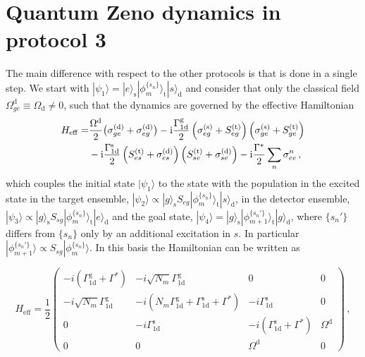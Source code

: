 \documentclass[twocolumn,pra,aps,superscriptaddress,showpacs]{revtex4-1}
\newcommand{\ket}[1]{|#1\rangle}
\def\oned{\mathrm{1d}}
\newcommand{\src}{\mathrm{(s)}}
\newcommand{\trg}{\mathrm{(t)}}
\newcommand{\dtc}{\mathrm{(d)}}
\def\ii{\mathord{\rm i}}
\newcommand{\rs}{\mathrm{s}}
\newcommand{\rd}{\mathrm{d}}
\newcommand{\rg}{\mathrm{g}}
\newcommand{\rt}{\mathrm{t}}
\begin{document}
\section{Quantum Zeno dynamics in protocol 3}\label{appendix: zeno2}


The main difference with respect to the other protocols is that is done in a single step. We start with  $\ket{\psi_1} = \ket{e}_\rs \ket{\phi_m^{\{s_n\}}}_\rt \ket{s}_\rd$ and consider that only the classical field $\Omega_{ge}^\rd\equiv \Omega_\rd \neq 0$, such that the dynamics are governed by the effective Hamiltonian
%
\begin{align} \label{eqSM:Hameff}
H_\mathrm{eff}
	=& \frac{\Omega^\rd}{2}\big(\sigma_{ge}^\dtc + \sigma_{eg}^\dtc \big) 
		-\ii \frac{\Gamma_{\oned}^\rg}{2}\left(\sigma_{eg}^\src + S_{eg}^\trg\right) \left(\sigma_{ge}^\src+S_{ge}^\trg \right) \nonumber \\ 
	&-\ii \frac{\Gamma_{\oned}^\rs}{2} \left(S_{es}^\trg + \sigma_{es}^\dtc \right) 
		\left(S_{se}^\trg + \sigma_{se}^\dtc \right)
	-\ii \frac{\Gamma^*}{2}\sum_{n}\sigma^{n}_{ee} \,,
\end{align}
%
which couples the initial state $\ket{\psi_1}$ to the state with the population in the excited state in the target ensemble,
$\ket{\psi_2} \propto \ket{g}_\rs S_{eg}\ket{\phi_m^{\{s_n\}}}_\rt \ket{s}_\rd$, in the detector ensemble,
$\ket{\psi_3} \propto \ket{g}_\rs S_{sg}\ket{\phi_m^{\{s_n\}}}_\rt \ket{e}_\rd$ and the goal state,
$\ket{\psi_4} = \ket{g}_\rs \ket{\phi_{m+1}^{\{s_n'\}}}_\rt \ket{g}_\rd$, where $\{s_n'\}$ differs from $\{s_n\}$ only by an additional excitation in $s$. In particular $\ket{\phi_{m+1}^{\{s_n'\}}} \propto S_{sg}\ket{\phi_m^{\{s_n\}}}$.
In this basis the Hamiltonian can be written as
%
\begin{widetext}
\begin{equation*}
	H_{\mathrm{eff}} = 
	\frac{1}{2} \left( \begin{array}{cccc} 
	-i (\Gamma_\oned^\rg+\Gamma^*) & -i \sqrt{N_m} \Gamma_\oned^\rg & 0  & 0 \\
	-i \sqrt{N_m}\Gamma_\oned^\rg  & - i (N_m \Gamma_\oned^\rg+\Gamma_\oned^\rs+\Gamma^*) & -i \Gamma_\oned^\rs  & 0 \\
	0 & -i \Gamma_\oned^\rs & -i (\Gamma_\oned^\rs+\Gamma^*) & \Omega^\rd \\
	0 & 0 & \Omega^\rd & 0
	\end{array} \right)\,,
	\label{eq:Ham1step}
\end{equation*}
\end{widetext}
%
\end{document}
